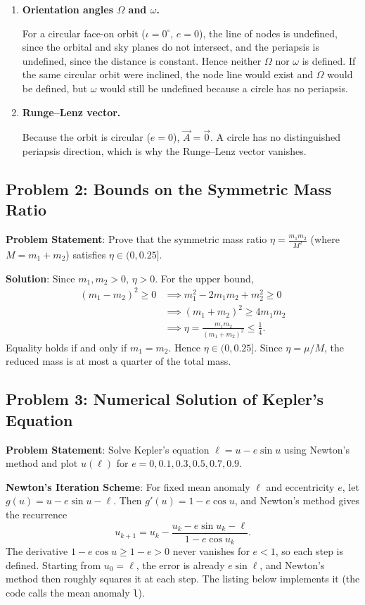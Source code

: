 \begin{enumerate}[label=(\alph*)]
	\item \textbf{Orientation angles $\Omega$ and $\omega$.}
	
	For a circular face-on orbit ($\iota=0^\circ$, $e=0$), the line of nodes is undefined, since the orbital and sky planes do not intersect, and the periapsis is undefined, since the distance is constant. Hence neither $\Omega$ nor $\omega$ is defined. If the same circular orbit were inclined, the node line would exist and $\Omega$ would be defined, but $\omega$ would still be undefined because a circle has no periapsis.
	
	\item \textbf{Runge--Lenz vector.}
	
	Because the orbit is circular ($e=0$), $\vec A = \vec 0$. A circle has no distinguished periapsis direction, which is why the Runge--Lenz vector vanishes.
\end{enumerate}

\subsection{Problem 2: Bounds on the Symmetric Mass Ratio}

\textbf{Problem Statement}: Prove that the symmetric mass ratio $\eta = \frac{m_1m_2}{M^2}$ (where $M = m_1+m_2$) satisfies $\eta \in (0, 0.25]$.

\textbf{Solution}: Since $m_1, m_2 > 0$, $\eta > 0$. For the upper bound,
\begin{align*}
	(m_1-m_2)^2 \ge 0 &\implies m_1^2 - 2m_1m_2 + m_2^2 \ge 0 \\
	&\implies (m_1+m_2)^2 \ge 4m_1m_2 \\
	&\implies \eta = \frac{m_1m_2}{(m_1+m_2)^2} \le \frac{1}{4}.
\end{align*}
Equality holds if and only if $m_1 = m_2$. Hence $\boxed{\eta \in (0, 0.25]}$. Since $\eta=\mu/M$, the reduced mass is at most a quarter of the total mass.

\subsection{Problem 3: Numerical Solution of Kepler's Equation}
\label{tb:prob:kepler_newton}

\textbf{Problem Statement}: Solve Kepler's equation $\ell = u - e\sin u$ using Newton's method and plot $u(\ell)$ for $e = 0, 0.1, 0.3, 0.5, 0.7, 0.9$.

\textbf{Newton's Iteration Scheme}:
For fixed mean anomaly $\ell$ and eccentricity $e$, let $g(u) = u - e\sin u - \ell$. Then $g'(u) = 1 - e\cos u$, and Newton's method gives the recurrence
\begin{equation}
	u_{k+1} = u_k - \frac{u_k - e\sin u_k - \ell}{1 - e\cos u_k}.
\end{equation}
The derivative $1-e\cos u\ge1-e>0$ never vanishes for $e<1$, so each step is defined. Starting from $u_0=\ell$, the error is already $e\sin\ell$, and Newton's method then roughly squares it at each step. The listing below implements it (the code calls the mean anomaly \texttt{l}).

